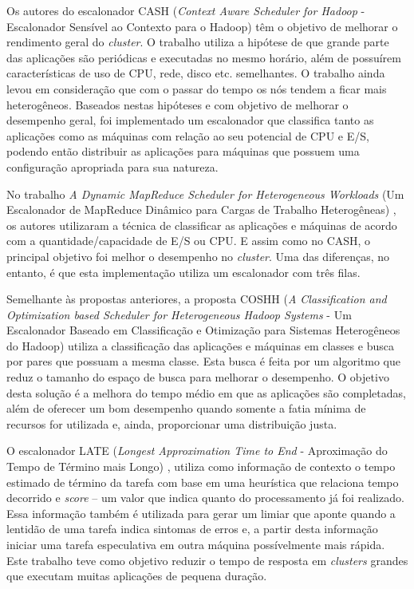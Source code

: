 

Os autores do escalonador CASH (\emph{Context Aware Scheduler for Hadoop} - Escalonador Sensível ao Contexto para o Hadoop) \cite{CASH} têm o objetivo de melhorar o rendimento geral do \emph{cluster}. O trabalho utiliza a hipótese de que grande parte das aplicações são periódicas e executadas no mesmo horário, além de possuírem características de uso de CPU, rede, disco etc. semelhantes. O trabalho ainda levou em consideração que com o passar do tempo os nós tendem a ficar mais heterogêneos. Baseados nestas hipóteses e com objetivo de melhorar o desempenho geral, foi implementado um escalonador que classifica tanto as aplicações como as máquinas com relação ao seu potencial de CPU e E/S, podendo então distribuir as aplicações para máquinas que possuem uma configuração apropriada para sua natureza.

No trabalho \textit{A Dynamic MapReduce Scheduler for Heterogeneous Workloads} (Um Escalonador de MapReduce Dinâmico para Cargas de Trabalho Heterogêneas) \cite{DMRSHW}, os autores utilizaram a técnica de classificar as aplicações e máquinas de acordo com a quantidade/capacidade de E/S ou CPU. E assim como no CASH, o principal objetivo foi melhor o desempenho no \textit{cluster}. Uma das diferenças, no entanto, é que esta implementação utiliza um escalonador com três filas.

Semelhante às propostas anteriores, a proposta COSHH (\textit{A Classification and Optimization based Scheduler for Heterogeneous Hadoop Systems} - Um Escalonador Baseado em Classificação e Otimização para Sistemas Heterogêneos do Hadoop) \cite{COSHH} utiliza a classificação das aplicações e máquinas em classes e busca por pares que possuam a mesma classe. Esta busca é feita por um algoritmo que reduz o tamanho do espaço de busca para melhorar o desempenho. O objetivo desta solução é a melhora do tempo médio em que as aplicações são completadas, além de oferecer um bom desempenho quando somente a fatia mínima de recursos for utilizada e, ainda, proporcionar uma distribuição justa.

O escalonador LATE (\textit{Longest Approximation Time to End} - Aproximação do Tempo de Término mais Longo) \cite{LATE}, utiliza como informação de contexto o tempo estimado de término da tarefa com base em uma heurística que relaciona tempo decorrido e \textit{score} -- um valor que indica quanto do processamento já foi realizado. Essa informação também é utilizada para gerar um limiar que aponte quando a lentidão de uma tarefa indica sintomas de erros e, a partir desta informação iniciar uma tarefa especulativa em outra máquina possívelmente mais rápida. Este trabalho teve como objetivo reduzir o tempo de resposta em \textit{clusters} grandes que executam muitas aplicações de pequena duração.

